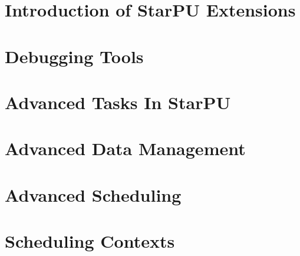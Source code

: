 %
%
%
%
%
\newcommand\starputitle{StarPU Handbook - StarPU Extensions}
\setcounter{tocdepth}{2}


\chapter{Introduction of StarPU Extensions}
\label{index}
\hypertarget{index}{}


\chapter{Debugging Tools}
\label{DebuggingTools}
\hypertarget{DebuggingTools}{}


\chapter{Advanced Tasks In StarPU}
\label{AdvancedTasksInStarPU}
\hypertarget{AdvancedTasksInStarPU}{}


\chapter{Advanced Data Management}
\label{AdvancedDataManagement}
\hypertarget{AdvancedDataManagement}{}


\chapter{Advanced Scheduling}
\label{AdvancedScheduling}
\hypertarget{AdvancedScheduling}{}


\chapter{Scheduling Contexts}
\label{SchedulingContexts}
\hypertarget{SchedulingContexts}{}


